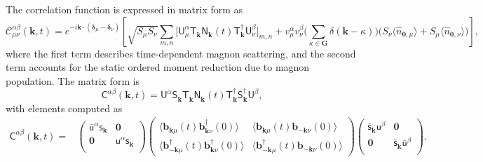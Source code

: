 \documentclass[aps, prx, nofootinbib, superscriptaddress]{revtex4-2}
\newcommand{\kvec}{\mathbf{k}}
\begin{document}
The correlation function is expressed in matrix form as
\begin{equation}
    \mathcal{C}^{\alpha\beta}_{\mu\nu} (\kvec, t)
    = e^{ - i \kvec \cdot (\mathbf{\delta}_{\mu} - \mathbf{\delta}_{\nu})}  
    \left[
    \sqrt{S_{\mu}S_{\nu}} \sum_{m,n}
    \Big[ \mathsf{U}^{\alpha}_{\mu}
    \mathsf{T}_{\kvec}^{\phantom\dagger} \mathsf{N}_{\kvec}^{\phantom\dagger} (t) \mathsf{T}_{\kvec}^{\dagger}
    \mathsf{U}^{\beta}_{\nu} \Big]_{m,n}
    + v_{\mu}^{\alpha} v_{\nu}^{\beta}
    \Big( \sum_{\kappa \in \mathbf{G}} \delta(\kvec - \kappa) \Big)
    \Big( S_{\nu}\langle \hat{n}_{\mathbf{0}, \mu} \rangle + S_{\mu}\langle \hat{n}_{\mathbf{0}, \nu} \rangle \Big)
    \right],
\end{equation}
where the first term describes time-dependent magnon scattering, and the second term accounts for the static ordered moment reduction due to magnon population. The matrix form is
\begin{equation}\label{eq: matrix form of spin-spin correlation matrix}
    \mathsf{C}^{\alpha\beta} (\kvec, t)
    = 
    \mathsf{U}^{\alpha} 
    \mathsf{S}_{\kvec}^{\phantom \dagger} 
    \mathsf{T}_{\kvec}^{\phantom \dagger} 
    \mathsf{N}_{\kvec}^{\phantom \dagger}  (t)
    \mathsf{T}_{\kvec}^{         \dagger}
    \mathsf{S}_{\kvec}^{         \dagger}
    \mathsf{U}^{\beta},
\end{equation}
with elements computed as
\begin{align*}
    \mathsf{C}^{\alpha\beta} (\kvec, t) = & 
    \begin{pmatrix}
        \bar{\mathsf{u}}^{\alpha} \mathsf{s}_{\kvec}  & \mathbf{0} \\
        \mathbf{0} & \mathsf{u}^{\alpha} \mathsf{s}_{\kvec} \\
    \end{pmatrix}
    \begin{pmatrix}     
        \langle \mathbf{b}_{ \mathbf{k}\mu}           (t)    \mathbf{b}_{ \mathbf{k}\nu}^{\dagger} (0)    \rangle & 
        \langle \mathbf{b}_{ \mathbf{k}\mu}           (t)    \mathbf{b}_{-\mathbf{k}\nu}           (0)    \rangle \\
        \langle \mathbf{b}_{-\mathbf{k}\mu}^{\dagger} (t)    \mathbf{b}_{ \mathbf{k}\nu}^{\dagger} (0)    \rangle & 
        \langle \mathbf{b}_{-\mathbf{k}\mu}^{\dagger} (t)    \mathbf{b}_{-\mathbf{k}\nu}           (0)    \rangle
    \end{pmatrix}
    \begin{pmatrix}
        \bar{\mathsf{s}}_{\kvec} \mathsf{u}^{\beta} & \mathbf{0} \\
        \mathbf{0} & \bar{\mathsf{s}}_{\kvec} \bar{\mathsf{u}}^{\beta} \\
    \end{pmatrix}.
\end{align*}
\end{document}
